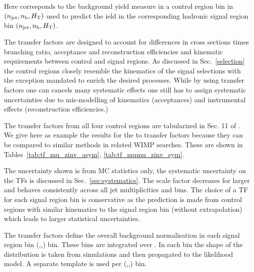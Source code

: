 Here \nobs corresponds to the background yield measure in a control region bin in $(n_{\text{jet}},n_{\text{b}},\mbox{$H_\text{T}$})$ used to predict the 
ield \npre in the corresponding hadronic signal region bin $(n_{\text{jet}},n_{\text{b}},\mbox{$H_\text{T}$})$.



The transfer factors are designed to account for differences in cross sections times branching ratio, acceptance and reconstruction efficiencies and 
kinematic requirements between control and signal regions. As discussed in Sec.~\ref{selection} the control regions closely resemble the kinematics of the signal selections with the exception mandated to enrich the desired processes. While by using transfer factors one can cancels many systematic effects one still has to assign systematic uncertainties due to mis-modelling of kinematics  (\eg acceptances) and instrumental effects (\eg reconstruction efficiencies.)


The transfer factors from all four control regions are tabularized in Sec. 11 of \cite{alphaTnote}.
We give here as example the results for the \gj to \znunu transfer factors because they can be compared to similar methods in related WIMP searches.
These are shown in Tables~\ref{tab:tf_mu_zinv_asym}, \ref{tab:tf_mumu_zinv_sym}. 





The uncertainty shown is from MC statistics only, the systematic uncertainty on the TFs is discussed in Sec.~\ref{sec:systematics}.
The scale factor decreases for larger \HT and behaves consistently across all jet multiplicities and \HT bins. 
The choice of a TF for each signal region bin is conservative as the prediction is made from control regions with similar kinematics
to the signal region bin (without extrapolation) which leads to larger statistical uncertainties.

The transfer factors define the overall background normalisation in each signal region bin (\njet,\nb,\HT) bin. These bins are
integrated over \mht. In each bin the shape of the \mht distribution is taken from simulations and then propagated to the likelihood model. 
A separate \mht template is used per (\njet,\nb,\HT) bin.


